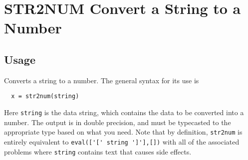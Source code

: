 \section{STR2NUM Convert a String to a Number}

\subsection{Usage}

Converts a string to a number.  The general syntax for its use
is
\begin{verbatim}
  x = str2num(string)
\end{verbatim}
Here \verb|string| is the data string, which contains the data to 
be converted into a number.  The output is in double precision,
and must be typecasted to the appropriate type based on what
you need.  Note that by definition, \verb|str2num| is entirely 
equivalent to \verb|eval(['[' string ']'],[])| with all of the 
associated problems where \verb|string| contains text that causes
side effects.
